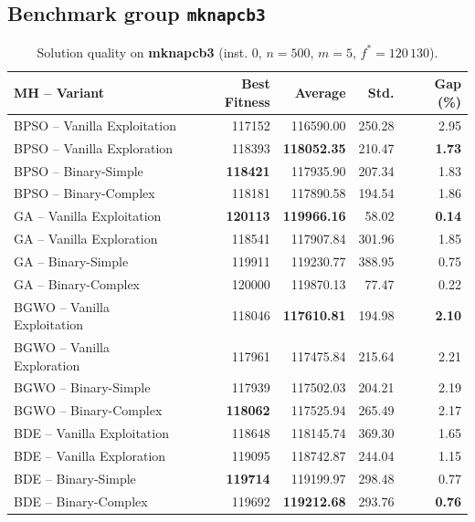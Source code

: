 \documentclass[journal,article,submit,moreauthors]{Definitions/mdpi}
\begin{document}
\clearpage
\subsection{Benchmark group \texttt{mknapcb3}}

\begin{table}[htbp]
  \centering
  \small
  \caption{Solution quality on \textbf{mknapcb3} (inst. 0, $n=500$, $m=5$, $f^*=120\,130$).}
  \label{tab:calidad_mknapcb3_0}
  \begin{tabular}{lrrrr}
    \toprule
    \textbf{MH -- Variant} &
    \textbf{Best Fitness} &
    \textbf{Average} &
    \textbf{Std.} &
    \textbf{Gap (\%)} \\
    \midrule
    BPSO -- Vanilla Exploitation &         117152 &        116590.00 & 250.28 &         2.95 \\
    BPSO -- Vanilla Exploration  &         118393 & \textbf{118052.35} & 210.47 & \textbf{1.73} \\
    BPSO -- Binary-Simple        & \textbf{118421} &        117935.90 & 207.34 &         1.83 \\
    BPSO -- Binary-Complex       &         118181 &        117890.58 & 194.54 &         1.86 \\
    \midrule
    GA -- Vanilla Exploitation   & \textbf{120113} & \textbf{119966.16} &  58.02 & \textbf{0.14} \\
    GA -- Vanilla Exploration    &         118541 &        117907.84 & 301.96 &         1.85 \\
    GA -- Binary-Simple          &         119911 &        119230.77 & 388.95 &         0.75 \\
    GA -- Binary-Complex         &         120000 &        119870.13 &  77.47 &         0.22 \\
    \midrule
    BGWO -- Vanilla Exploitation &         118046 & \textbf{117610.81} & 194.98 & \textbf{2.10} \\
    BGWO -- Vanilla Exploration  &         117961 &        117475.84 & 215.64 &         2.21 \\
    BGWO -- Binary-Simple        &         117939 &        117502.03 & 204.21 &         2.19 \\
    BGWO -- Binary-Complex       & \textbf{118062} &        117525.94 & 265.49 &         2.17 \\
    \midrule
    BDE -- Vanilla Exploitation  &         118648 &        118145.74 & 369.30 &         1.65 \\
    BDE -- Vanilla Exploration   &         119095 &        118742.87 & 244.04 &         1.15 \\
    BDE -- Binary-Simple         & \textbf{119714} &        119199.97 & 298.48 &         0.77 \\
    BDE -- Binary-Complex        &         119692 & \textbf{119212.68} & 293.76 & \textbf{0.76} \\
    \bottomrule
  \end{tabular}
\end{table}
\end{document}
